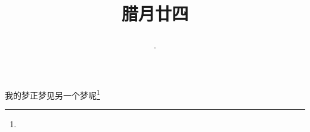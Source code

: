 \title{\date[d=3,m=2,y=2024][year:cn-y,年,month:cn,day:cn,日,·,weekday]·腊月廿四 }
我的梦正梦见另一个梦呢\footnote{ }

